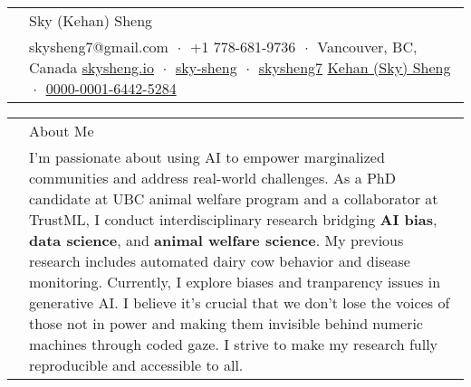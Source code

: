 \documentclass[letterpaper, 11pt]{article}
\newcommand{\socialicon}[1]{\raisebox{-0.05em}{\resizebox{!}{1em}{#1}}}
\newcommand{\headingfont}{\Large\color{OliveGreen}}
\newenvironment{SectionTable}[1]{
	\renewcommand*{\arraystretch}{1.7}
	\setlength{\tabcolsep}{10pt}
	\begin{longtable}{Rp{5.2in}} & #1 \\}
{\end{longtable}\vspace{-.3cm}}
\begin{document}

\begin{SectionTable}{\Huge Sky (Kehan) Sheng} & 
skysheng7@gmail.com  $\;\boldsymbol{\cdot}\;$ 
+1 778-681-9736 $\;\boldsymbol{\cdot}\;$ Vancouver, BC, Canada\newline
\socialicon{\faGlobe} \href{https://skysheng.io}{skysheng.io} $\;\boldsymbol{\cdot}\;$
\socialicon{\faLinkedin} \href{www.linkedin.com/in/sky-sheng}{sky-sheng} $\;\boldsymbol{\cdot}\;$
\socialicon{\faGithub} \href{https://github.com/skysheng7}{skysheng7} \newline 
\socialicon{\faGraduationCap} \href{https://scholar.google.com/citations?user=yz-cWVgAAAAJ}{Kehan (Sky) Sheng}
$\;\boldsymbol{\cdot}\;$ 
\socialicon{\faOrcid} \href{https://orcid.org/0000-0001-6442-5284}{0000-0001-6442-5284} 
\end{SectionTable}

\begin{SectionTable}{\headingfont About Me}
& I'm passionate about using AI to empower marginalized communities and address real-world challenges. As a PhD candidate at UBC animal welfare program and a collaborator at TrustML, I conduct interdisciplinary research bridging \textbf{AI bias}, \textbf{data science}, and \textbf{animal welfare science}. My previous research includes automated dairy cow behavior and disease monitoring. Currently, I explore biases and tranparency issues in generative AI. I believe it's crucial that we don't lose the voices of those not in power and making them invisible behind numeric machines through coded gaze. I strive to make my research fully reproducible and accessible to all.
\end{SectionTable}
\end{document}
